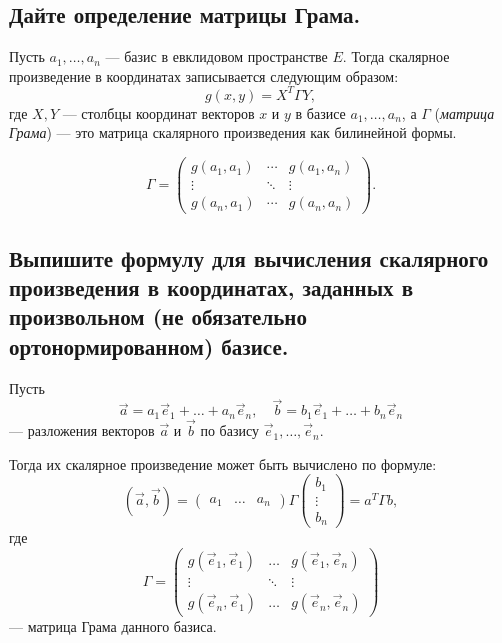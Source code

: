 \subsection{Дайте определение матрицы Грама.}

\begin{definition}
    Пусть $a_1, \ldots, a_n$ --- базис в евклидовом пространстве $E$.
    Тогда скалярное произведение в координатах записывается следующим образом:
    \[
        g(x, y) = X^T \Gamma Y,
    \]
    где $X, Y$ --- столбцы координат векторов $x$ и $y$ в базисе
    $a_1, \ldots, a_n$, а $\Gamma$ (\textit{матрица Грама}) --- это матрица скалярного произведения как билинейной формы.
    
    \[
        \Gamma =
        \begin{pmatrix}
            g(a_1, a_1) & \cdots & g(a_1, a_n) \\
            \vdots & \ddots & \vdots \\
            g(a_n, a_1) & \cdots & g(a_n, a_n)
        \end{pmatrix}.
    \]
\end{definition}


\subsection{Выпишите формулу для вычисления скалярного произведения в координатах, заданных в произвольном (не обязательно ортонормированном) базисе.}

\begin{theorem}
    Пусть
    \[
        \vec{a} = a_1\vec{e}_1 + \ldots + a_n\vec{e}_n,
        \quad
        \vec{b} = b_1\vec{e}_1 + \ldots + b_n\vec{e}_n
    \]
    --- разложения векторов $\vec{a}$ и $\vec{b}$ по базису
    $\vec{e}_1, \ldots, \vec{e}_n$.

    Тогда их скалярное произведение может быть вычислено по формуле:
    \[
        (\vec{a}, \vec{b})
        =
        \begin{pmatrix}
            a_1 & \ldots & a_n
        \end{pmatrix}
        \Gamma
        \begin{pmatrix}
            b_1 \\
            \vdots \\
            b_n
        \end{pmatrix}
        =
        a^T \Gamma b,
    \]
    где
    \[
        \Gamma =
        \begin{pmatrix}
            g(\vec{e}_1, \vec{e}_1) & \ldots & g(\vec{e}_1, \vec{e}_n) \\
            \vdots & \ddots & \vdots \\
            g(\vec{e}_n, \vec{e}_1) & \ldots & g(\vec{e}_n, \vec{e}_n)
        \end{pmatrix}
    \]
    --- матрица Грама данного базиса.
\end{theorem}

